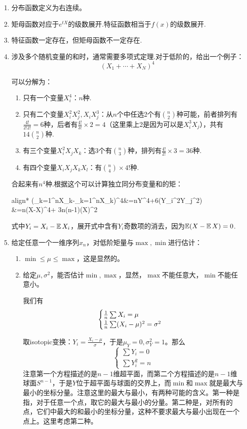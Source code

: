 \begin{note}
	\begin{enumerate}
		\item 分布函数定义为右连续。
		\item 矩母函数对应于$e^{tX}$的级数展开.特征函数相当于$f(x)$的级数展开.
		\item 特征函数一定存在，但矩母函数不一定存在.
	\item 涉及多个随机变量的和时，通常需要多项式定理.对于低阶的，给出一个例子：
	$$(X_1+\cdots+X_N)^4$$
	
	可以分解为：
	\begin{enumerate}
		\item 只有一个变量$X_i^4$：$n$种.
		\item 只有二个变量$X_i^2X_j^2, X_iX_j^3$：从$n$个中任选2个有$\binom{n}{2}$种可能，前者排列有$\frac{4!}{2!2!}=6$种，后者有$\frac{4!}{3!}\times 2=4$（这里乘上2是因为可以是$X_i^3X_j$），共有$14\binom{n}{2}$种.
		\item 有三个变量$X_i^2X_jX_k$：选3个有$\binom{n}{3}$种，排列有$\frac{4!}{2!}\times 3=36$种.
		\item 有四个变量$X_iX_jX_kX_l$：有$\binom{n}{4}\times 4!$种.
	\end{enumerate}
	
	合起来有$n^4$种.根据这个可以计算独立同分布变量和的矩：
	\begin{empheq}{align*}
		\E\left(\sum_{k=1}^nX_k-\sum_{k=1}^n\E X_k\right)^4&=n\E Y^4+6\times {}\E (Y_i^2Y_j^2)\\
		&=n\E (X-\E X)^4+ 3n(n-1)(\Var X)^2\\
	\end{empheq}
	
	式中$Y_i=X_i-\operatorname{\mathbb{E}} X_i$，展开式中含有$Y_i$奇数项的消去，因为$\operatorname{\mathbb{E}}(X-\operatorname{\mathbb{E}} X)=0$.
\item 给定任意一个一维序列$x_n$，对低阶矩量与$\max,\min$进行估计：
\begin{enumerate}
	\item $\min\leq \mu\leq \max$，这是显然的。
	\item 给定$\mu,\sigma^2$，能否估计$\min,\max$，显然，$\max$不能任意大，$\min$不能任意小。
	
	我们有
\[	\begin{cases}
	\frac{1}{n}\sum X_i=\mu\\
	\frac{1}{n}\sum (X_i-\mu)^2=\sigma^2
	\end{cases}\]

取isotopic变换：$Y_i=\frac{X_i-\mu}{\sigma}$，于是$\mu_Y=0,\sigma^2_Y=1$。那么
\[\begin{cases}
\sum Y_i=0\\
\sum Y_i^2=n
\end{cases}\]
注意第一个方程描述的是$n-1$维超平面，而第二个方程描述的是$n-1$维球面$S^{n-1}$，于是$Y$位于超平面与球面的交界上，而$\min$和$\max$就是最大与最小的坐标分量。注意这里的最大与最小，有两种可能的含义。第一种是指，对于任意一个点，取它的最大与最小的分量。第二种是，对所有的点，它们中最大的和最小的坐标分量，这种不要求最大与最小出现在一个点上。这里考虑第二种。


\end{enumerate}
\end{enumerate}
\end{note}
